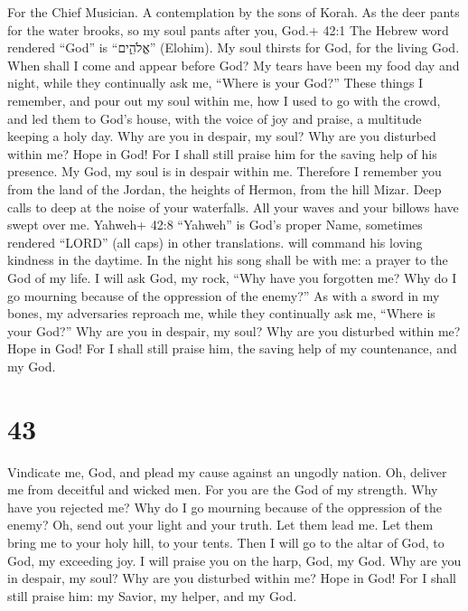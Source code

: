 For the Chief Musician. A contemplation by the sons of Korah.
 As the deer pants for the water brooks, so my soul pants
after you, God.+ 42:1 The Hebrew word rendered ``God'' is ``אֱלֹהִ֑ים''
(Elohim).  My soul thirsts for God, for the living God. When
shall I come and appear before God?  My tears have been my
food day and night, while they continually ask me, ``Where is your
God?''  These things I remember, and pour out my soul within
me, how I used to go with the crowd, and led them to God's house, with
the voice of joy and praise, a multitude keeping a holy day.
 Why are you in despair, my soul? Why are you disturbed
within me? Hope in God! For I shall still praise him for the saving help
of his presence.  My God, my soul is in despair within me.
Therefore I remember you from the land of the Jordan, the heights of
Hermon, from the hill Mizar.  Deep calls to deep at the
noise of your waterfalls. All your waves and your billows have swept
over me.  Yahweh+ 42:8 ``Yahweh'' is God's proper Name,
sometimes rendered ``LORD'' (all caps) in other translations. will
command his loving kindness in the daytime. In the night his song shall
be with me: a prayer to the God of my life.  I will ask God,
my rock, ``Why have you forgotten me? Why do I go mourning because of
the oppression of the enemy?''  As with a sword in my
bones, my adversaries reproach me, while they continually ask me,
``Where is your God?''  Why are you in despair, my soul?
Why are you disturbed within me? Hope in God! For I shall still praise
him, the saving help of my countenance, and my God.

\hypertarget{section-42}{%
\section{43}\label{section-42}}

 Vindicate me, God, and plead my cause against an ungodly
nation. Oh, deliver me from deceitful and wicked men.  For
you are the God of my strength. Why have you rejected me? Why do I go
mourning because of the oppression of the enemy?  Oh, send
out your light and your truth. Let them lead me. Let them bring me to
your holy hill, to your tents.  Then I will go to the altar
of God, to God, my exceeding joy. I will praise you on the harp, God, my
God.  Why are you in despair, my soul? Why are you disturbed
within me? Hope in God! For I shall still praise him: my Savior, my
helper, and my God.

